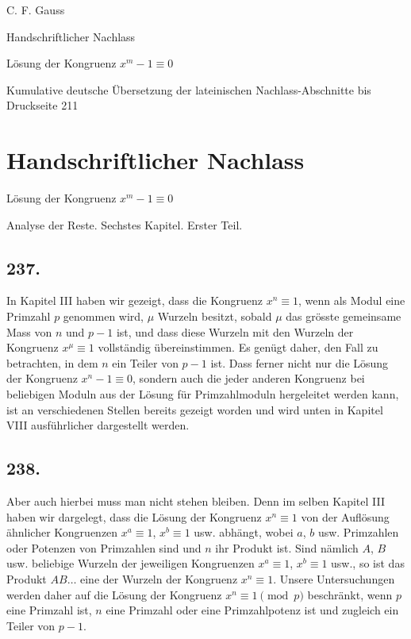 \documentclass[12pt]{article}
\begin{document}
\begin{center}
{\Large C. F. Gauss}\par
{\large Handschriftlicher Nachlass}\par
{\large Lösung der Kongruenz $x^m-1\equiv0$}\par
{\large Kumulative deutsche Übersetzung der lateinischen Nachlass-Abschnitte bis Druckseite 211}
\end{center}

\section*{Handschriftlicher Nachlass}

\begin{center}
{\large Lösung der Kongruenz $x^m-1 \equiv 0$}\par
{\large Analyse der Reste. Sechstes Kapitel. Erster Teil.}
\end{center}

\subsection*{237.}
In Kapitel III haben wir gezeigt, dass die Kongruenz $x^n\equiv 1$, wenn als Modul eine Primzahl $p$ genommen wird, $\mu$ Wurzeln besitzt, sobald $\mu$ das grösste gemeinsame Mass von $n$ und $p-1$ ist, und dass diese Wurzeln mit den Wurzeln der Kongruenz $x^\mu\equiv 1$ vollständig übereinstimmen. Es genügt daher, den Fall zu betrachten, in dem $n$ ein Teiler von $p-1$ ist. Dass ferner nicht nur die Lösung der Kongruenz $x^n-1\equiv 0$, sondern auch die jeder anderen Kongruenz bei beliebigen Moduln aus der Lösung für Primzahlmoduln hergeleitet werden kann, ist an verschiedenen Stellen bereits gezeigt worden und wird unten in Kapitel VIII ausführlicher dargestellt werden.

\subsection*{238.}
Aber auch hierbei muss man nicht stehen bleiben. Denn im selben Kapitel III haben wir dargelegt, dass die Lösung der Kongruenz $x^n\equiv 1$ von der Auflösung ähnlicher Kongruenzen $x^a\equiv 1$, $x^b\equiv 1$ usw. abhängt, wobei $a$, $b$ usw. Primzahlen oder Potenzen von Primzahlen sind und $n$ ihr Produkt ist. Sind nämlich $A$, $B$ usw. beliebige Wurzeln der jeweiligen Kongruenzen $x^a\equiv 1$, $x^b\equiv 1$ usw., so ist das Produkt $AB\ldots$ eine der Wurzeln der Kongruenz $x^n\equiv 1$. Unsere Untersuchungen werden daher auf die Lösung der Kongruenz $x^n\equiv 1\pmod p$ beschränkt, wenn $p$ eine Primzahl ist, $n$ eine Primzahl oder eine Primzahlpotenz ist und zugleich ein Teiler von $p-1$.
\end{document}
